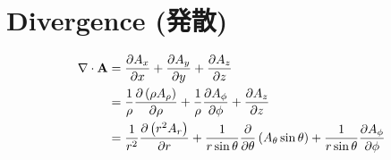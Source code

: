 %
%
%
%
%
\section{Divergence (発散)}

\begin{align}
  \nabla \cdot \mathbf{A}
      & = {\partial A_x \over \partial x} + {\partial A_y \over \partial y} + {\partial A_z \over \partial z} \\
      & = {1 \over \rho}{\partial \left( \rho A_\rho \right) \over \partial \rho} + {1 \over \rho}{\partial A_\phi \over \partial \phi} + {\partial A_z \over \partial z} \\
      & = {1 \over r^2}{\partial \left( r^2 A_r \right) \over \partial r} + {1 \over r\sin\theta}{\partial \over \partial \theta} \left( A_\theta\sin\theta \right) + {1 \over r\sin\theta}{\partial A_\phi \over \partial \phi}
\end{align}
